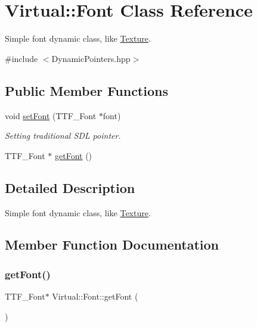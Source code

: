 \hypertarget{class_virtual_1_1_font}{}\section{Virtual\+:\+:Font Class Reference}
\label{class_virtual_1_1_font}


Simple font dynamic class, like \hyperlink{class_virtual_1_1_texture}{Texture}.  




{\ttfamily \#include $<$Dynamic\+Pointers.\+hpp$>$}

\subsection*{Public Member Functions}
\begin{DoxyCompactItemize}
\item 
void \hyperlink{class_virtual_1_1_font_ad0ca95bbe50987aedb3b6efa53ec252b}{set\+Font} (T\+T\+F\+\_\+\+Font $\ast$font)
\begin{DoxyCompactList}\small\item\em Setting traditional S\+DL pointer. \end{DoxyCompactList}\item 
T\+T\+F\+\_\+\+Font $\ast$ \hyperlink{class_virtual_1_1_font_a4771650afab7d6a292a439b29eaef81f}{get\+Font} ()
\end{DoxyCompactItemize}


\subsection{Detailed Description}
Simple font dynamic class, like \hyperlink{class_virtual_1_1_texture}{Texture}. 

\subsection{Member Function Documentation}
\hypertarget{class_virtual_1_1_font_a4771650afab7d6a292a439b29eaef81f}{}\label{class_virtual_1_1_font_a4771650afab7d6a292a439b29eaef81f} 
\subsubsection{\texorpdfstring{get\+Font()}{getFont()}}
{\footnotesize\ttfamily T\+T\+F\+\_\+\+Font$\ast$ Virtual\+::\+Font\+::get\+Font (\begin{DoxyParamCaption}{ }\end{DoxyParamCaption})}

